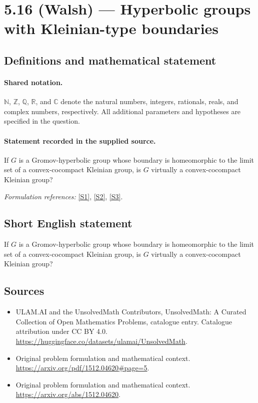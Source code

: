 \documentclass[11pt]{article}
\newcommand{\sref}[2]{\hyperlink{source:#1:#2}{[S#2]}}
\begin{document}
\section{5.16 (Walsh) — Hyperbolic groups with Kleinian-type boundaries}\label{statement}

\subsection{Definitions and mathematical statement}

\paragraph{Shared notation.}$\mathbb N$, $\mathbb Z$, $\mathbb Q$, $\mathbb R$, and $\mathbb C$ denote the natural numbers, integers, rationals, reals, and complex numbers, respectively. All additional parameters and hypotheses are specified in the question.


\paragraph{Statement recorded in the supplied source.}
If $G$ is a Gromov-hyperbolic group whose boundary is homeomorphic to the limit set of a convex-cocompact Kleinian group, is $G$ virtually a convex-cocompact Kleinian group?
\par\smallskip\textit{Formulation references:} \sref{statement}{1}, \sref{statement}{2}, \sref{statement}{3}.
\subsection{Short English statement}
If $G$ is a Gromov-hyperbolic group whose boundary is homeomorphic to the limit set of a convex-cocompact Kleinian group, is $G$ virtually a convex-cocompact Kleinian group?
\subsection{Sources}
\begin{itemize}
\item[\hypertarget{source:statement:1}{S1}] ULAM.AI and the UnsolvedMath Contributors, UnsolvedMath: A Curated Collection of Open Mathematics Problems, catalogue entry. Catalogue attribution under CC BY 4.0.
\url{https://huggingface.co/datasets/ulamai/UnsolvedMath}.
\item[\hypertarget{source:statement:2}{S2}] Original problem formulation and mathematical context.
\url{https://arxiv.org/pdf/1512.04620#page=5}.
\item[\hypertarget{source:statement:3}{S3}] Original problem formulation and mathematical context.
\url{https://arxiv.org/abs/1512.04620}.
\end{itemize}
\label{end:statement}
\end{document}
